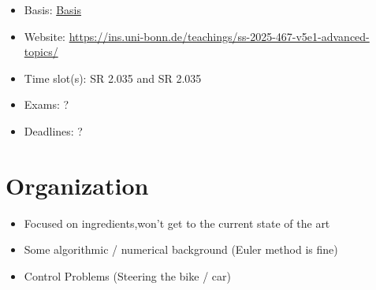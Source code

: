 \begin{tcolorbox}[enhanced,breakable,
	title=General Information,frame style={color=mycolor}]
    \begin{itemize}
        \item Basis: \href{https://basis.uni-bonn.de/qisserver/rds?state=verpublish&status=init&vmfile=no&publishid=261270&moduleCall=webInfo&publishConfFile=webInfo&publishSubDir=veranstaltung}{Basis}
        \item Website: \href{https://ins.uni-bonn.de/teachings/ss-2025-467-v5e1-advanced-topics/}{https://ins.uni-bonn.de/teachings/ss-2025-467-v5e1-advanced-topics/}
        \item Time slot(s):  SR 2.035 and  SR 2.035
        \item Exams: ?
        \item Deadlines: ?
    \end{itemize}
\end{tcolorbox}

\section{Organization}

\begin{itemize}
    \item Focused on ingredients,won't get to the current state of the art
    \item Some algorithmic / numerical background (Euler method is fine)
    \item Control Problems (Steering the bike / car)
\end{itemize}


